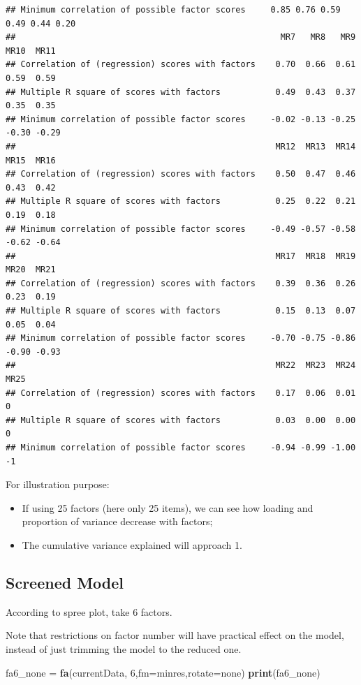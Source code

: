\documentclass[
]{ctexart}
\newenvironment{Shaded}{\begin{snugshade}}{\end{snugshade}}
\newcommand{\AttributeTok}[1]{\textcolor[rgb]{0.13,0.29,0.53}{#1}}
\newcommand{\DecValTok}[1]{\textcolor[rgb]{0.00,0.00,0.81}{#1}}
\newcommand{\FunctionTok}[1]{\textcolor[rgb]{0.13,0.29,0.53}{\textbf{#1}}}
\newcommand{\NormalTok}[1]{#1}
\newcommand{\OtherTok}[1]{\textcolor[rgb]{0.56,0.35,0.01}{#1}}
\newcommand{\StringTok}[1]{\textcolor[rgb]{0.31,0.60,0.02}{#1}}
\providecommand{\tightlist}{%
  \setlength{\itemsep}{0pt}\setlength{\parskip}{0pt}}
\begin{document}
\begin{verbatim}
## Minimum correlation of possible factor scores     0.85 0.76 0.59 0.49 0.44 0.20
##                                                     MR7   MR8   MR9  MR10  MR11
## Correlation of (regression) scores with factors    0.70  0.66  0.61  0.59  0.59
## Multiple R square of scores with factors           0.49  0.43  0.37  0.35  0.35
## Minimum correlation of possible factor scores     -0.02 -0.13 -0.25 -0.30 -0.29
##                                                    MR12  MR13  MR14  MR15  MR16
## Correlation of (regression) scores with factors    0.50  0.47  0.46  0.43  0.42
## Multiple R square of scores with factors           0.25  0.22  0.21  0.19  0.18
## Minimum correlation of possible factor scores     -0.49 -0.57 -0.58 -0.62 -0.64
##                                                    MR17  MR18  MR19  MR20  MR21
## Correlation of (regression) scores with factors    0.39  0.36  0.26  0.23  0.19
## Multiple R square of scores with factors           0.15  0.13  0.07  0.05  0.04
## Minimum correlation of possible factor scores     -0.70 -0.75 -0.86 -0.90 -0.93
##                                                    MR22  MR23  MR24 MR25
## Correlation of (regression) scores with factors    0.17  0.06  0.01    0
## Multiple R square of scores with factors           0.03  0.00  0.00    0
## Minimum correlation of possible factor scores     -0.94 -0.99 -1.00   -1
\end{verbatim}

For illustration purpose:

\begin{itemize}
\tightlist
\item
  If using 25 factors (here only 25 items), we can see how loading and
  proportion of variance decrease with factors;
\item
  The cumulative variance explained will approach 1.
\end{itemize}

\hypertarget{screened-model}{%
\subsection{Screened Model}\label{screened-model}}

According to spree plot, take 6 factors.

Note that restrictions on factor number will have practical effect on
the model, instead of just trimming the model to the reduced one.

\begin{Shaded}
\begin{Highlighting}[]
\NormalTok{fa6\_none }\OtherTok{=} \FunctionTok{fa}\NormalTok{(currentData, }\DecValTok{6}\NormalTok{,}\AttributeTok{fm=}\StringTok{\textquotesingle{}minres\textquotesingle{}}\NormalTok{,}\AttributeTok{rotate=}\StringTok{\textquotesingle{}none\textquotesingle{}}\NormalTok{)  }
\FunctionTok{print}\NormalTok{(fa6\_none)}
\end{Highlighting}
\end{Shaded}
\end{document}
